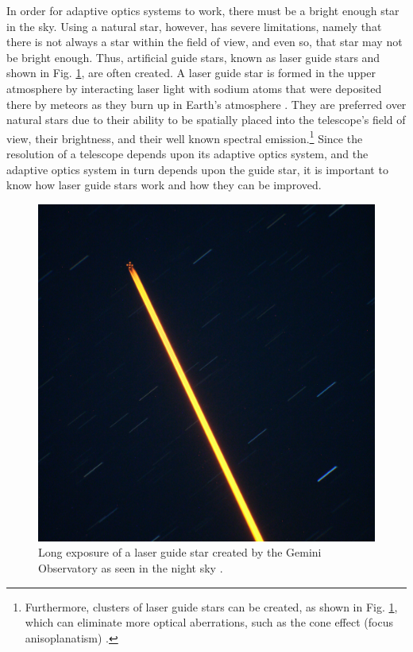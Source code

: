 In order for adaptive optics systems to work, there must be a bright enough star in the sky. Using a natural star, however, has severe limitations, namely that there is not always a star within the field of view, and even so, that star may not be bright enough. Thus,  artificial guide stars, known as laser guide stars and shown in Fig. \ref{fig:lgs2}, are often created. A laser guide star is formed in the upper atmosphere by interacting laser light with sodium atoms that were deposited there by meteors as they burn up in Earth's atmosphere \cite{Kibblewhite2009}. They are preferred over natural stars due to their ability to be spatially placed into the telescope's field of view, their brightness, and their well known spectral emission.\footnote{Furthermore, clusters of laser guide stars can be created, as shown in Fig. \ref{fig:lgs2}, which can eliminate more optical aberrations, such as the cone effect (focus anisoplanatism) \cite{multiplelgs}.} Since the resolution of a telescope depends upon its adaptive optics system, and the adaptive optics system in turn depends upon the guide star, it is important to know how laser guide stars work and how they can be improved. 

\begin{figure}[t]
		\centering
		\includegraphics[width = .8\textwidth]{Images/lgsinsky.jpg}
		\caption{Long exposure of a laser guide star created by the Gemini Observatory as seen in the night sky \protect\cite{gemini}.}
		\label{fig:lgs2}
\end{figure}


